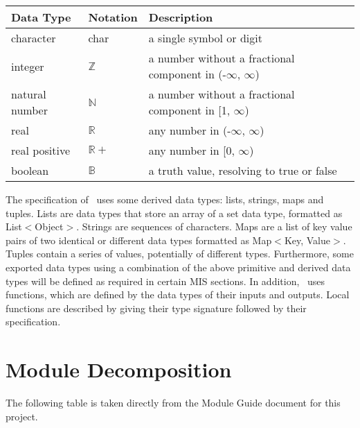 \documentclass[12pt, titlepage]{article}
\begin{document}
\begin{center}
\renewcommand{\arraystretch}{1.2}
\noindent 
\begin{tabular}{l l p{7.5cm}} 
\toprule 
\textbf{Data Type} & \textbf{Notation} & \textbf{Description}\\ 
\midrule
character & char & a single symbol or digit\\
integer & $\mathbb{Z}$ & a number without a fractional component in (-$\infty$, $\infty$) \\
natural number & $\mathbb{N}$ & a number without a fractional component in [1, $\infty$) \\
real & $\mathbb{R}$ & any number in (-$\infty$, $\infty$)\\
real positive & $\mathbb{R}+$ & any number in [0, $\infty$) \\
boolean & $\mathbb{B}$ & a truth value, resolving to true or false \\
\bottomrule
\end{tabular} 
\end{center}

\noindent
The specification of \progname \ uses some derived data types: lists, strings, maps
and tuples. Lists are data types that store an array of a set data type, formatted as List$<$Object$>$. Strings
are sequences of characters. Maps are a list of key value pairs of two identical or different data types
formatted as Map$<$Key, Value$>$. Tuples contain a series of values, potentially of
different types. Furthermore, some exported data types using a combination of the above
primitive and derived data types will be defined as required in certain
MIS sections. In addition, \progname \ uses functions, which
are defined by the data types of their inputs and outputs. Local functions are
described by giving their type signature followed by their specification.

\section{Module Decomposition}

The following table is taken directly from the Module Guide document for this project.
\end{document}

